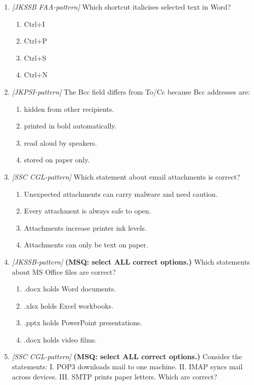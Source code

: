 \begin{enumerate}[label=\textbf{Q\arabic*.}, leftmargin=*]
\item \textit{[JKSSB FAA-pattern]} Which shortcut italicises selected text in Word?
  \begin{enumerate}[label=\Alph*.]
    \item Ctrl+I
    \item Ctrl+P
    \item Ctrl+S
    \item Ctrl+N
  \end{enumerate}
\item \textit{[JKPSI-pattern]} The Bcc field differs from To/Cc because Bcc addresses are:
  \begin{enumerate}[label=\Alph*.]
    \item hidden from other recipients.
    \item printed in bold automatically.
    \item read aloud by speakers.
    \item stored on paper only.
  \end{enumerate}
\item \textit{[SSC CGL-pattern]} Which statement about email attachments is correct?
  \begin{enumerate}[label=\Alph*.]
    \item Unexpected attachments can carry malware and need caution.
    \item Every attachment is always safe to open.
    \item Attachments increase printer ink levels.
    \item Attachments can only be text on paper.
  \end{enumerate}
\item \textit{[JKSSB-pattern]} \textbf{(MSQ: select ALL correct options.)} Which statements about MS Office files are correct?
  \begin{enumerate}[label=\Alph*.]
    \item .docx holds Word documents.
    \item .xlsx holds Excel workbooks.
    \item .pptx holds PowerPoint presentations.
    \item .docx holds video films.
  \end{enumerate}
\item \textit{[SSC CGL-pattern]} \textbf{(MSQ: select ALL correct options.)} Consider the statements: I. POP3 downloads mail to one machine. II. IMAP syncs mail across devices. III. SMTP prints paper letters. Which are correct?
  \begin{enumerate}[label=\Alph*.]

\end{enumerate}
\end{enumerate}
